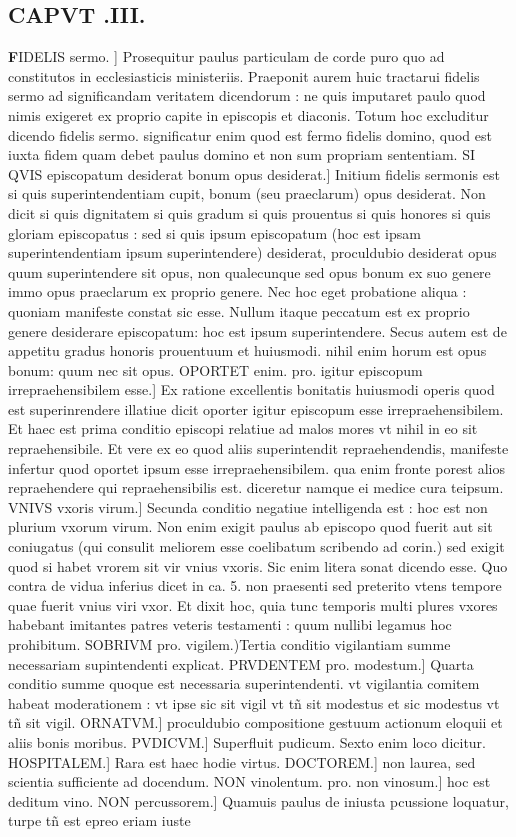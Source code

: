 \documentclass{article}
\begin{document}
\begin{pages}
\endnumbering\beginnumbering\section{CAPVT .III.}\pstart \huge\textbf{F}\normalsize IDELIS sermo. ] Prosequitur paulus particulam de corde puro quo ad constitutos in ecclesiasticis ministeriis. Praeponit aurem huic tractarui fidelis sermo ad significandam veritatem dicendorum : ne quis imputaret paulo quod nimis exigeret ex proprio capite in episcopis et diaconis. Totum hoc excluditur dicendo fidelis sermo. significatur enim quod est fermo fidelis domino, quod est iuxta fidem quam debet paulus domino et non sum propriam sententiam. SI QVIS episcopatum desiderat bonum opus desiderat.] Initium fidelis sermonis est si quis superintendentiam cupit, bonum (seu praeclarum) opus desiderat. Non dicit si quis dignitatem si quis gradum si quis prouentus si quis honores si quis gloriam episcopatus : sed si quis ipsum episcopatum (hoc est ipsam superintendentiam ipsum superintendere) desiderat, proculdubio desiderat opus quum superintendere sit opus, non qualecunque sed opus bonum ex suo genere immo opus praeclarum ex proprio genere. Nec hoc eget probatione aliqua : quoniam manifeste constat sic esse. Nullum itaque peccatum est ex proprio genere desiderare episcopatum: hoc est ipsum superintendere. Secus autem est de appetitu gradus honoris prouentuum et huiusmodi. nihil enim horum est opus bonum: quum nec sit opus. OPORTET enim. pro. igitur  episcopum irrepraehensibilem esse.] Ex ratione excellentis bonitatis huiusmodi operis quod est superinrendere illatiue dicit oporter igitur episcopum esse irrepraehensibilem. Et haec est prima conditio episcopi relatiue ad malos mores vt nihil in eo sit repraehensibile. Et vere ex eo quod aliis superintendit repraehendendis, manifeste infertur quod oportet ipsum esse irrepraehensibilem. qua enim fronte porest alios repraehendere qui repraehensibilis est. diceretur namque ei medice cura teipsum. VNIVS vxoris virum.] Secunda conditio negatiue intelligenda est : hoc est non plurium vxorum virum. Non enim exigit paulus ab episcopo quod fuerit aut sit coniugatus (qui consulit meliorem esse coelibatum scribendo ad corin.) sed exigit quod si habet vrorem sit vir vnius vxoris. Sic enim litera sonat dicendo esse. Quo contra de vidua inferius dicet in ca. 5. non praesenti sed preterito vtens tempore quae fuerit vnius viri vxor. Et dixit hoc, quia tunc temporis multi plures vxores habebant imitantes patres veteris testamenti : quum nullibi legamus hoc prohibitum. SOBRIVM pro. vigilem.)Tertia conditio vigilantiam summe necessariam supintendenti explicat. PRVDENTEM pro. modestum.] Quarta conditio summe quoque est necessaria superintendenti. vt vigilantia comitem habeat moderationem : vt ipse sic sit vigil vt tñ sit modestus et sic modestus vt tñ sit vigil. ORNATVM.] proculdubio compositione gestuum actionum eloquii et aliis bonis moribus. PVDICVM.] Superfluit pudicum. Sexto enim loco dicitur. HOSPITALEM.] Rara est haec hodie virtus. DOCTOREM.] non laurea, sed scientia sufficiente ad docendum. NON vinolentum. pro. non vinosum.] hoc est deditum vino. NON percussorem.] Quamuis paulus de iniusta pcussione loquatur, turpe tñ est epreo eriam iuste 
\end{pages}
\end{document}
